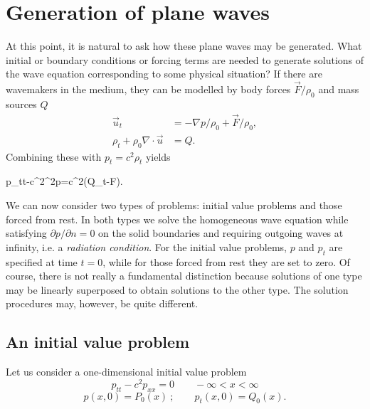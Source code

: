 \sourcepagebreak

\section{Generation of plane waves}

At this point, it is natural to ask how these plane waves may be generated. What
initial or boundary conditions or forcing terms are needed to generate solutions of the
wave equation corresponding to some physical situation? If there are wavemakers in
the medium, they can be modelled by body forces $\vec F/\rho_0$ and mass sources $Q$
\begin{align*}
	\vec u_t                       & =-\nabla p/\rho_0+\vec F/\rho_0, \\
	\rho_t+\rho_0\nabla\cdot\vec u & =Q.
\end{align*}
Combining these with $p_t=c^2\rho_t$ yields
\begin{waveequation}
	p_{tt}-c^2\nabla^2p=c^2(Q_t-\nabla\cdot\vec F).
\end{waveequation}
We can now consider two types of problems: initial value problems and those forced
from rest. In both types we solve the homogeneous wave equation while satisfying
$\partial p/\partial n=0$ on the solid boundaries and requiring outgoing waves at infinity, i.e. a
\emph{radiation condition}. For the initial value problems, $p$ and $p_t$ are specified at time $t=0$,
while for those forced from rest they are set to zero. Of course, there is not really a
fundamental distinction because solutions of one type may be linearly superposed to
obtain solutions to the other type. The solution procedures may, however, be quite
different.

\subsection{An initial value problem}

Let us consider a one-dimensional initial value problem
\[
	p_{tt}-c^2p_{xx}=0\qquad -\infty<x<\infty
\]
\[
	p(x,0)=P_0(x)\ ;\qquad p_t(x,0)=Q_0(x).
\]

\sourcepagebreak

